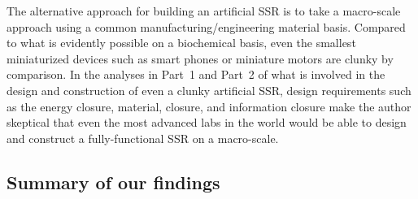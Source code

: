 The alternative approach for building an artificial SSR is to take a
macro-scale approach using a
common manufacturing/engineering material basis.
Compared to what is evidently possible on a biochemical basis, even
the smallest miniaturized devices such as smart phones or miniature
motors are clunky by comparison.  In the analyses in Part~1 and
Part~2 of what is involved in the design and construction of even
a clunky artificial SSR, design requirements such as the energy
closure, material, closure, and information closure make the author
skeptical that even the most advanced labs in the world would be
able to design and construct a fully-functional SSR on a macro-scale.

\subsection{Summary of our findings}

